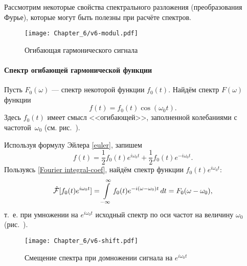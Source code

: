 
Рассмотрим некоторые свойства спектрального разложения (преобразования Фурье),
которые могут быть полезны при расчёте спектров.

\begin{wrapfigure}{o}{0.3\textwidth}
 \centering\texttt{[image: Chapter\_6/v6-modul.pdf]}
 \caption{Огибающая гармонического сигнала}
\end{wrapfigure}

\paragraph{Спектр огибающей гармонической функции}
Пусть $F_0(\omega)$ --- спектр некоторой функции $f_0(t)$.
Найдём спектр $F(\omega)$ функции
\begin{equation*}
f(t)=f_0(t)\cos(\omega_0 t).
\end{equation*}
Здесь $f_0(t)$ имеет смысл <<огибающей>>, заполненной колебаниями
с частотой~$\omega_0$ (см. рис.~).

Используя формулу Эйлера \eqref{euler}, запишем
\begin{equation*}
    f(t)=\frac{1}{2}f_0(t)e^{i\omega_0t}+\frac{1}{2}f_0(t)e^{-i\omega_0t}.
\end{equation*}
Пользуясь \eqref{Fourier integral-coef}, найдём спектр
функции $f_0(t)e^{i\omega_0 t}$:
\begin{equation}
    \eqmark{task-spectrum-shift}
    \hat{\mathcal{F}}[f_0(t)e^{i\omega_0 t}]=
\int\limits_{-\infty}^\infty
f_0(t)e^{-i(\omega-\omega_0)t}\,dt=F_0(\omega-\omega_0),
\end{equation}
т.~е. при умножении на $e^{i\omega_0 t}$ исходный спектр
 по оси частот на величину $\omega_0$
(рис.~).

\begin{figure}[h!]
\centering\texttt{[image: Chapter\_6/v6-shift.pdf]}
\caption{Смещение спектра при домножении сигнала на $e^{i\omega_0 t}$}
\end{figure}

%

